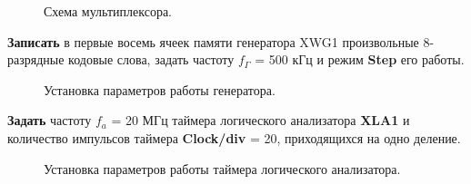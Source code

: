 \documentclass[spec, och, otchet, hidelinks]{SCWorks}
\begin{document}
\begin{figure}[h]
	\caption{Схема мультиплексора.}
\end{figure}

\newpage

\par \textbf{Записать} в первые восемь ячеек памяти генератора XWG1 произвольные 8-разрядные кодовые 
слова, задать частоту $ f_{\Gamma} $ = 500 кГц и режим \textbf{Step} его работы.

\begin{figure}[h]
	\caption{Установка параметров работы генератора.}
\end{figure}

\par \textbf{Задать} частоту $ f_a $ = 20 МГц таймера логического анализатора \textbf{XLA1} и количество 
импульсов таймера \textbf{Clock/div} = 20, приходящихся на одно деление.

\begin{figure}[h]
	\caption{Установка параметров работы таймера логического анализатора.}
\end{figure}
\end{document}
